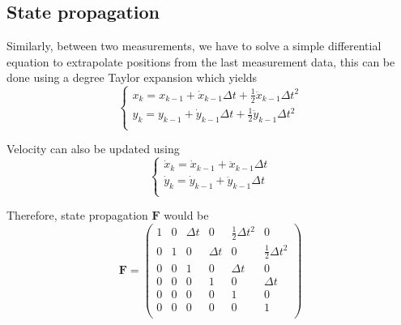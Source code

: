 \documentclass[12pt]{article}
\begin{document}
\subsection{State propagation}
Similarly, between two measurements, we have to solve a simple differential equation to extrapolate positions from the last measurement data, this can be done using a  degree Taylor expansion which yields
\begin{equation}
\left\{
    \begin{array}{l}
    x_k
    = x_{k-1} + \dot{x}_{k-1}\Delta{t} + \frac{1}{2}\ddot{x}_{k-1}\Delta{t}^2 \\
    y_k
    = y_{k-1} + \dot{y}_{k-1}\Delta{t} + \frac{1}{2}\ddot{y}_{k-1}\Delta{t}^2 \\
    \end{array}
\right.
\end{equation}

Velocity can also be updated using
\begin{equation}
\left\{
    \begin{array}{l}
    \dot{x}_k = \dot{x}_{k-1} + \ddot{x}_{k-1}\Delta{t} \\
    \dot{y}_k = \dot{y}_{k-1} + \ddot{y}_{k-1}\Delta{t} \\
    \end{array}
\right.
\end{equation}

Therefore, state propagation $\mathbf{F}$ would be
\begin{equation}
\mathbf{F} =
    \begin{pmatrix}
        1 & 0 & \Delta{t} & 0 & \frac{1}{2}\Delta{t}^2 & 0 \\
        0 & 1 & 0 & \Delta{t} & 0 & \frac{1}{2}\Delta{t}^2 \\
        0 & 0 & 1 & 0 & \Delta{t} & 0 \\
        0 & 0 & 0 & 1 & 0 & \Delta{t} \\
        0 & 0 & 0 & 0 & 1 & 0 \\
        0 & 0 & 0 & 0 & 0 & 1 \\
    \end{pmatrix}
\end{equation}
\end{document}
